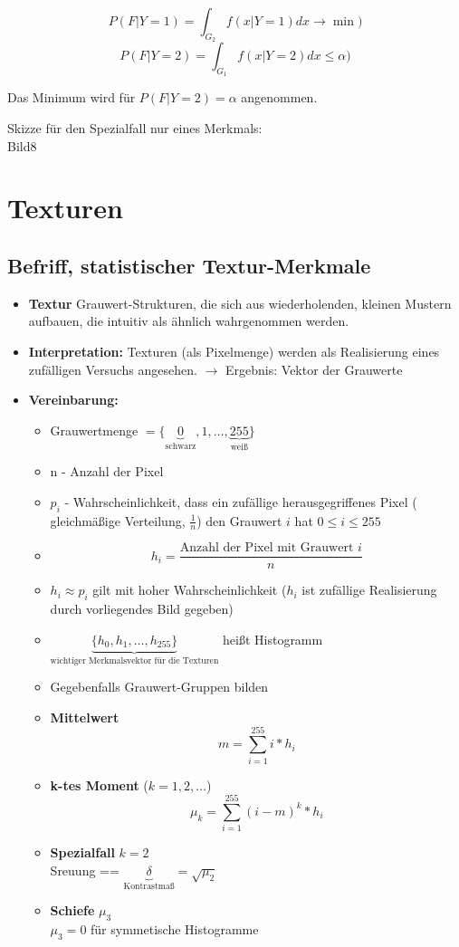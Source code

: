 \documentclass[a4paper,12pt]{scrreprt}
\newcommand{\itemd}[1]{\item{\textbf{#1}} }
\begin{document}
$$ P(F| Y=1) = \int_{G_2} f(x| Y=1) dx \to \min) $$
$$ P(F| Y=2) = \int_{G_1} f(x| Y=2) dx \leq \alpha) $$

Das Minimum wird für $P(F|Y=2) = \alpha$ angenommen.

Skizze für den Spezialfall nur eines Merkmals:\\
Bild8

\section{Texturen}

\subsection{Befriff, statistischer Textur-Merkmale}


\begin{itemize}
 \itemd{Textur} Grauwert-Strukturen, die sich aus wiederholenden, kleinen Mustern aufbauen, die intuitiv als ähnlich wahrgenommen werden.
 \itemd{Interpretation:}
 Texturen (als Pixelmenge) werden als Realisierung eines zufälligen Versuchs angesehen. $\rightarrow$ Ergebnis: Vektor der Grauwerte
 \itemd{Vereinbarung:}
 \begin{itemize}
  \item Grauwertmenge $= \{ \underbrace{0}_{\text{schwarz}}, 1 , \dots , \underbrace{255}_{\text{weiß}} \}$
  \item n - Anzahl der Pixel
  \item $p_i$ - Wahrscheinlichkeit, dass ein zufällige herausgegriffenes Pixel (  gleichmäßige Verteilung, $\frac{1}{n}$) den Grauwert $i$ hat $ 0 \leq i \leq 255$
  \item $$h_i = \frac{\text{Anzahl der Pixel mit Grauwert } i}{n}$$
  \item $h_i \approx p_i$ gilt mit hoher Wahrscheinlichkeit ($h_i$ ist zufällige Realisierung durch vorliegendes Bild gegeben)
  \item $ \underbrace{ \{h_0, h_1 , \dots , h_255\}}_{\text{wichtiger Merkmalsvektor für die Texturen}}$ heißt Histogramm
  \item Gegebenfalls Grauwert-Gruppen bilden
  \itemd{ Mittelwert} $$ m = \sum_{i=1}^{255 } i *h_i  $$
  \itemd{k-tes Moment} ($k=1,2,\dots $) $$ \mu_k = \sum_{i=1}^{255} (i-m)^k * h_i $$
  \itemd{Spezialfall} $k=2$\\
  Sreuung == $ \underbrace{ \delta }_{\text{Kontrastmaß}} = \sqrt{\mu_2}$ 
  \itemd{Schiefe} $\mu_3$\\
  $\mu_3 = 0$ für symmetische Histogramme\\

\end{itemize}
\end{itemize}
\end{document}
